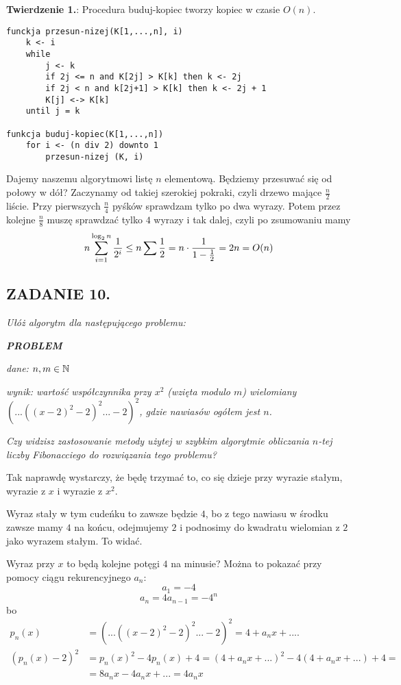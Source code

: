 \documentclass{article}
\begin{document}
\begin{center}
    \textbf{Twierdzenie 1.}: Procedura buduj-kopiec tworzy kopiec w czasie $O(n)$.

\begin{lstlisting}
funckja przesun-nizej(K[1,...,n], i)
    k <- i 
    while
        j <- k
        if 2j <= n and K[2j] > K[k] then k <- 2j
        if 2j < n and k[2j+1] > K[k] then k <- 2j + 1
        K[j] <-> K[k]
    until j = k

funkcja buduj-kopiec(K[1,...,n])
    for i <- (n div 2) downto 1
        przesun-nizej (K, i)
\end{lstlisting}
\end{center}
\smallskip

Dajemy naszemu algorytmowi listę $n$ elementową. Będziemy przesuwać się od połowy w dół? Zaczynamy od takiej szerokiej pokraki, czyli drzewo mające $\frac n2$ liście. Przy pierwszych $\frac n4$ pyśków sprawdzam tylko po dwa wyrazy. Potem przez kolejne $\frac n8$ muszę sprawdzać tylko $4$ wyrazy i tak dalej, czyli po zsumowaniu mamy
$$n\sum\limits_{i=1}^{\log_2n}{1\over 2^{i}}\leq n\sum\frac12=n\cdot {1\over 1-\frac12}=2n=O(n)$$

\subsection*{ZADANIE 10.}
\emph{Ułóż algorytm dla następującego problemu:}

\emph{\textbf{PROBLEM}}

\emph{dane: $n,m\in\mathbb{N}$}

\emph{wynik: wartość współczynnika przy $x^2$ (wzięta modulo $m$) wielomiany $(...((x-2)^2-2)^2...-2)^2$, gdzie nawiasów ogółem jest $n$.}

\emph{Czy widzisz zastosowanie metody użytej w szybkim algorytmie obliczania $n$-tej liczby Fibonacciego do rozwiązania tego problemu?}
\medskip

Tak naprawdę wystarczy, że będę trzymać to, co się dzieje przy wyrazie stałym, wyrazie z $x$ i wyrazie z $x^2$. 

Wyraz stały w tym cudeńku to zawsze będzie $4$, bo z tego nawiasu w środku zawsze mamy $4$ na końcu, odejmujemy $2$ i podnosimy do kwadratu wielomian z $2$ jako wyrazem stałym. To widać. 

Wyraz przy $x$ to będą kolejne potęgi $4$ na minusie? Można to pokazać przy pomocy ciągu rekurencyjnego $a_n$:
$$a_1=-4$$
$$a_n=4a_{n-1}=-4^n$$
bo
\begin{align*}
    p_n(x)&=(...((x-2)^2-2)^2...-2)^2=4+a_nx+....\\
    (p_n(x)-2)^2&=p_n(x)^2-4p_n(x)+4=(4+a_nx+...)^2-4(4+a_nx+...)+4=\\
    &=8a_nx-4a_nx+...=4a_nx
\end{align*}
\end{document}

